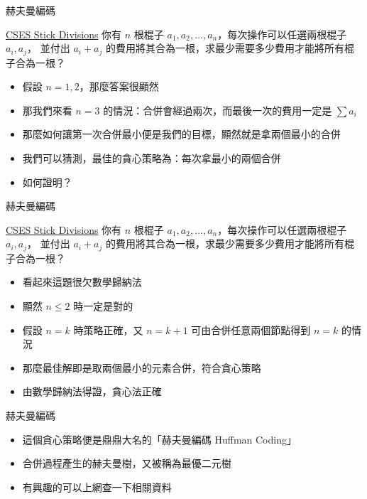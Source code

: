 \documentclass[aspectratio=169]{beamer}
\begin{document}
    \begin{frame}{赫夫曼編碼}
        \begin{block}{\href{https://cses.fi/problemset/task/1161}{CSES Stick Divisions}}
            你有 $n$ 根棍子 $a_1, a_2, \dots, a_n$，每次操作可以任選兩根棍子 $a_i, a_j$，
            並付出 $a_i + a_j$ 的費用將其合為一根，求最少需要多少費用才能將所有棍子合為一根？
        \end{block}

        \begin{itemize}
            \item<1-> 假設 $n = 1, 2$，那麼答案很顯然
            \item<2-> 那我們來看 $n = 3$ 的情況：合併會經過兩次，而最後一次的費用一定是 $\sum{a_i}$
            \item<3-> 那麼如何讓第一次合併最小便是我們的目標，顯然就是拿兩個最小的合併
            \item<4-> 我們可以猜測，最佳的貪心策略為：每次拿最小的兩個合併
            \item<5-> 如何證明？
        \end{itemize}
    \end{frame}

    \begin{frame}{赫夫曼編碼}
        \begin{block}{\href{https://cses.fi/problemset/task/1161}{CSES Stick Divisions}}
            你有 $n$ 根棍子 $a_1, a_2, \dots, a_n$，每次操作可以任選兩根棍子 $a_i, a_j$，
            並付出 $a_i + a_j$ 的費用將其合為一根，求最少需要多少費用才能將所有棍子合為一根？
        \end{block}

        \begin{itemize}
            \item<1-> 看起來這題很欠數學歸納法
            \item<2-> 顯然 $n \le 2$ 時一定是對的
            \item<3-> 假設 $n = k$ 時策略正確，又 $n = k + 1$ 可由合併任意兩個節點得到 $n = k$ 的情況
            \item<4-> 那麼最佳解即是取兩個最小的元素合併，符合貪心策略
            \item<5-> 由數學歸納法得證，貪心法正確
        \end{itemize}
    \end{frame}

    \begin{frame}{赫夫曼編碼}
        \begin{itemize}
            \item 這個貪心策略便是鼎鼎大名的「赫夫曼編碼 Huffman Coding」
            \item 合併過程產生的赫夫曼樹，又被稱為最優二元樹
            \item 有興趣的可以上網查一下相關資料
        \end{itemize}
    \end{frame}
    
\end{document}
